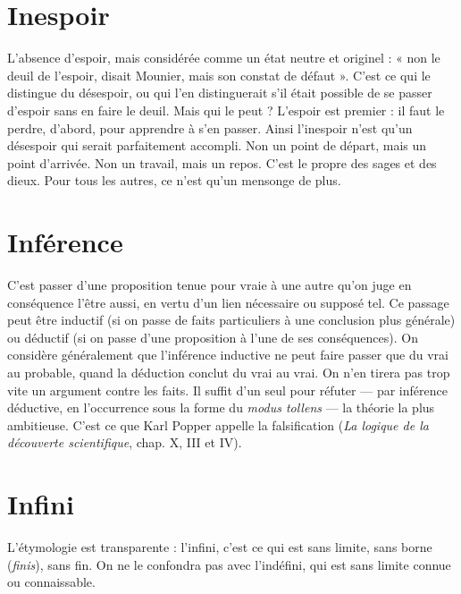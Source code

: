 \section{Inespoir}
L'absence d’espoir, mais considérée comme un état neutre et
originel : « non le deuil de l'espoir, disait Mounier, mais son
constat de défaut ». C’est ce qui le distingue du désespoir, ou qui l’en distinguerait
s’il était possible de se passer d’espoir sans en faire le deuil. Mais qui le
peut ? L'espoir est premier : il faut le perdre, d’abord, pour apprendre à s’en
passer. Ainsi l’inespoir n’est qu’un désespoir qui serait parfaitement accompli.
Non un point de départ, mais un point d’arrivée. Non un travail, mais un
repos. C’est le propre des sages et des dieux. Pour tous les autres, ce n’est qu’un
mensonge de plus.

\section{Inférence}
C’est passer d’une proposition tenue pour vraie à une autre
qu'on juge en conséquence l'être aussi, en vertu d’un lien
nécessaire ou supposé tel. Ce passage peut être inductif (si on passe de faits particuliers
à une conclusion plus générale) ou déductif (si on passe d’une proposition
à l’une de ses conséquences). On considère généralement que l’inférence
inductive ne peut faire passer que du vrai au probable, quand la déduction conclut
du vrai au vrai. On n’en tirera pas trop vite un argument contre les faits. Il
suffit d’un seul pour réfuter — par inférence déductive, en l’occurrence sous la
forme du {\it modus tollens} — la théorie la plus ambitieuse. C’est ce que Karl Popper
appelle la falsification ({\it La logique de la découverte scientifique}, chap. X, III et IV).

\section{Infini}
L’étymologie est transparente : l'infini, c’est ce qui est sans limite,
sans borne ({\it finis}), sans fin. On ne le confondra pas avec l’indéfini,
qui est sans limite connue ou connaissable.

